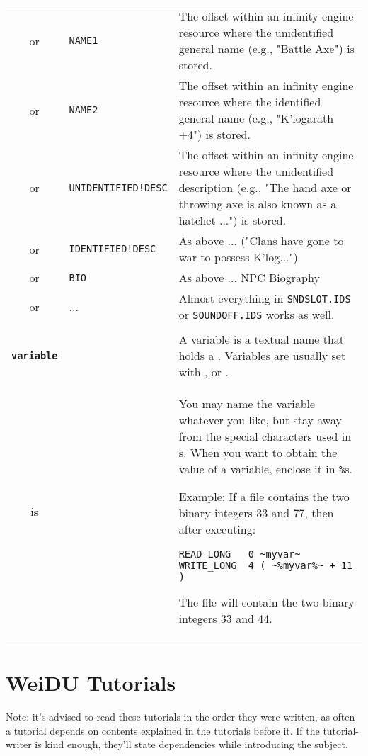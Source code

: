 \documentclass{article}
\def\ttref#1{\ahrefloc{#1}{\tt #1}}
\def\DEFINE#1{{\tt \bf #1}\label{#1}\index{#1}}
\def\t#1{{\tt #1}}
\begin{document}
\begin{tabular}{cp{10in}|p{10in}}
or & \t{NAME1}   & The offset within an infinity engine resource where the unidentified general name (e.g., "Battle Axe") is stored. \\
or & \t{NAME2}   & The offset within an infinity engine resource where the identified general name (e.g., "K'logarath +4") is stored. \\
or & \t{UNIDENTIFIED!DESC}  & The offset within an infinity engine resource where the unidentified description (e.g., "The hand axe or throwing axe is also known as a hatchet ...") is stored. \\
or & \t{IDENTIFIED!DESC}    & As above ... ("Clans have gone to war to possess K'log...")\\
or & \t{BIO}                & As above ... NPC Biography\\
or & ...        & Almost everything in \t{SNDSLOT.IDS} or \t{SOUNDOFF.IDS}
works as well. \\

\\

\DEFINE{variable} & & A variable is a textual name that holds a
\ttref{value}. Variables are usually set with \ttref{READ!BYTE},
\ttref{SET} or \ttref{SPRINT}. \\
is & \ttref{String} & You may name the variable whatever you like, but stay
away from the special characters used in \ttref{regexp}s. When you want to
obtain the value of a variable, enclose it in \t{\%}s.


Example: If a file contains the two binary integers 33 and 77, then after
executing:

\begin{verbatim}
READ_LONG   0 ~myvar~
WRITE_LONG  4 ( ~%myvar%~ + 11 )
\end{verbatim}

The file will contain the two binary integers 33 and 44. \\

\end{tabular}

\section{WeiDU \ttref{TP2} Tutorials}
\label{TP Tutorials}

Note: it's advised to read these tutorials in the order they were written,
as often a tutorial depends on contents explained in the tutorials before
it. If the tutorial-writer is kind enough, they'll state dependencies while
introducing the subject.
\end{document}
